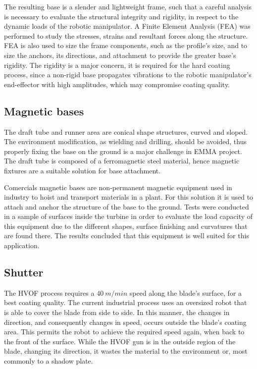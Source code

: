 The resulting base is a slender and lightweight frame, such that a careful
analysis is necessary to evaluate the structural integrity and rigidity, in
respect to the dynamic loads of the robotic manipulator. A Finite Element
Analysis (FEA) was performed to study the stresses, strains and resultant forces
along the structure. FEA is also used to size the frame components, such as
the profile's size, and to size the anchors, its directions, and attachment to
provide the greater base's rigidity. The rigidity is a major concern, it is
required for the hard coating process, since a non-rigid base propagates
vibrations to the robotic manipulator's end-effector with high amplitudes, which
may compromise coating quality.


\subsection{Magnetic bases}

The draft tube and runner area are conical shape structures, curved and
sloped. The environment modification, as wielding and drilling, should be
avoided, thus properly fixing the base on the ground is a major challenge in
EMMA project. The draft tube is composed of a ferromagnetic steel material,
hence magnetic fixtures are a suitable solution for base attachment. 

Comercials magnetic bases are non-permanent magnetic equipment used in industry
to hoist and transport materials in a plant.
For this solution it is used to attach and anchor the structure of the base to
the ground. 
Tests were conducted in a sample of surfaces inside the turbine in order to
evaluate the load capacity of this equipment due to the different shapes,
surface finishing and curvatures that are found there.
The results concluded that this equipment is well suited for this application.


\subsection{Shutter}

The HVOF process requires a $40~m/min$ speed along the blade's surface, for a
best coating quality. 
The current industrial process uses an oversized robot that is able to
cover the blade from side to side. In this manner, the changes in direction, and
consequently changes in speed, occurs outside the blade's coating area.
This permits the robot to achieve the required speed again, when back to the
front of the surface.
While the HVOF gun is in the outside region of the blade, changing its
direction, it wastes the material to the environment or, most commonly to a
shadow plate.

